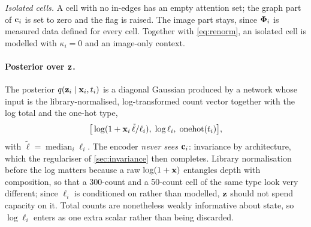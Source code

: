  \emph{Isolated cells.} A cell with no in-edges has an empty attention set; the graph part of $\mathbf{c}_i$ is set to zero and the flag is raised. The image part stays, since $\boldsymbol{\Phi}_i$ is measured data defined for every cell. Together with \cref{eq:renorm}, an isolated cell is modelled with $\kappa_i = 0$ and an image-only context.

\paragraph{Posterior over $\mathbf{z}$.}
The posterior $q(\mathbf{z}_i \mid \mathbf{x}_i, t_i)$ is a diagonal Gaussian produced by a network whose input is the library-normalised, log-transformed count vector together with the log total and the one-hot type,
\begin{equation}
  \big[\log(1 + \mathbf{x}_i\, \tilde\ell / \ell_i),\; \log \ell_i,\; \operatorname{onehot}(t_i)\big],
  \label{eq:encz-input}
\end{equation}
with $\tilde\ell = \operatorname{median}_i \ell_i$. The encoder \emph{never sees} $\mathbf{c}_i$: invariance by architecture, which the regulariser of \cref{sec:invariance} then completes. Library normalisation before the log matters because a raw $\log(1+\mathbf{x})$ entangles depth with composition, so that a 300-count and a 50-count cell of the same type look very different; since $\ell_i$ is conditioned on rather than modelled, $\mathbf{z}$ should not spend capacity on it. Total counts are nonetheless weakly informative about state, so $\log \ell_i$ enters as one extra scalar rather than being discarded.

